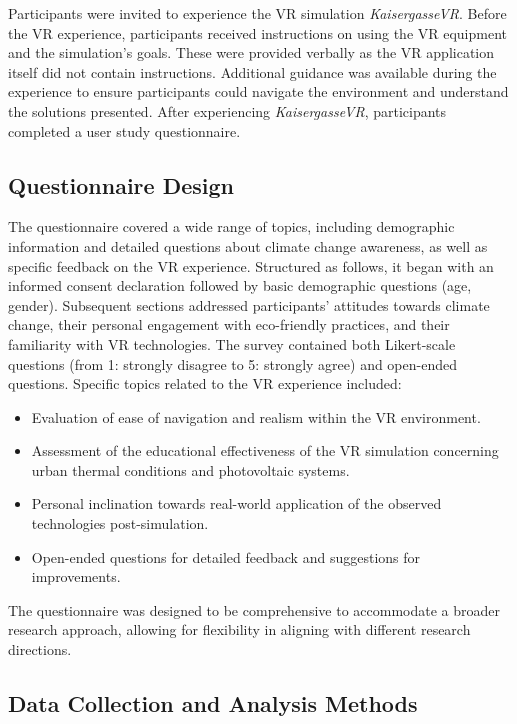 \documentclass[draft, final]{vutinfth} %
\begin{document}
Participants were invited to experience the VR simulation \textit{KaisergasseVR}. Before the VR experience, participants received instructions on using the VR equipment and the simulation's goals. These were provided verbally as the VR application itself did not contain instructions. Additional guidance was available during the experience to ensure participants could navigate the environment and understand the solutions presented. After experiencing \textit{KaisergasseVR}, participants completed a user study questionnaire.

\subsection{Questionnaire Design}

The questionnaire covered a wide range of topics, including demographic information and detailed questions about climate change awareness, as well as specific feedback on the VR experience. Structured as follows, it began with an informed consent declaration followed by basic demographic questions (age, gender). Subsequent sections addressed participants' attitudes towards climate change, their personal engagement with eco-friendly practices, and their familiarity with VR technologies. The survey contained both Likert-scale questions (from 1: strongly disagree to 5: strongly agree) and open-ended questions. Specific topics related to the VR experience included:

\begin{itemize}
    \item Evaluation of ease of navigation and realism within the VR environment.
    \item Assessment of the educational effectiveness of the VR simulation concerning urban thermal conditions and photovoltaic systems.
    \item Personal inclination towards real-world application of the observed technologies post-simulation.
    \item Open-ended questions for detailed feedback and suggestions for improvements.
\end{itemize}

The questionnaire was designed to be comprehensive to accommodate a broader research approach, allowing for flexibility in aligning with different research directions.

\subsection{Data Collection and Analysis Methods}
\end{document}
